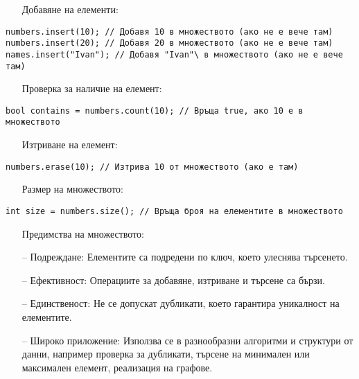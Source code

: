 \documentclass[oneside]{book}
\begin{document}
\begin{itemize}\item[Добавяне] на елементи:\end{itemize}
\begin{mdframed}\begin{lstlisting}
numbers.insert(10); // Добавя 10 в множеството (ако не е вече там)
numbers.insert(20); // Добавя 20 в множеството (ако не е вече там)
names.insert("Ivan"); // Добавя "Ivan"\ в множеството (ако не е вече там)
\end{lstlisting}\end{mdframed}

\begin{itemize}\item[Проверка] за наличие на елемент:\end{itemize}
\begin{mdframed}\begin{lstlisting}
bool contains = numbers.count(10); // Връща true, ако 10 е в множеството
\end{lstlisting}\end{mdframed}

\begin{itemize}\item[Изтриване] на елемент:\end{itemize}
\begin{mdframed}\begin{lstlisting}
numbers.erase(10); // Изтрива 10 от множеството (ако е там)
\end{lstlisting}\end{mdframed}

\begin{itemize}\item[Размер] на множеството:\end{itemize}
\begin{mdframed}\begin{lstlisting}
int size = numbers.size(); // Връща броя на елементите в множеството
\end{lstlisting}\end{mdframed}

\begin{itemize}\item[Предимства] на множеството:\end{itemize}
\begin{itemize}
    \item[--] Подреждане: Елементите са подредени по ключ, което улеснява търсенето.
    \item[--] Ефективност: Операциите за добавяне, изтриване и търсене са бързи.
    \item[--] Единственост: Не се допускат дубликати, което гарантира уникалност на елементите.
    \item[--] Широко приложение: Използва се в разнообразни алгоритми и структури от данни, например проверка за дубликати, търсене на минимален или максимален елемент, реализация на графове.
\end{itemize}
\end{document}
